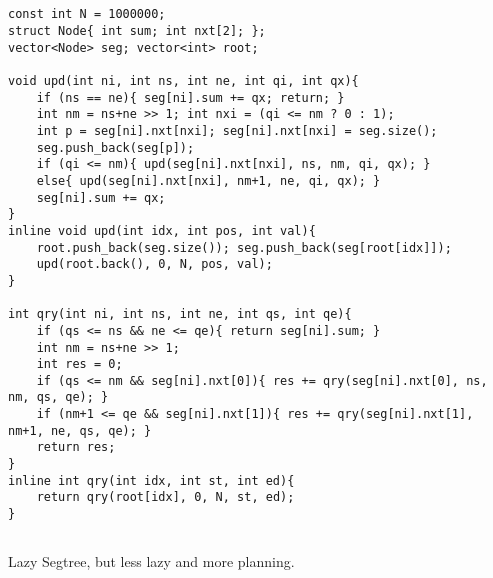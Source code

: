 \documentclass[landscape, 8pt, a4paper, oneside, twocolumn]{extarticle}
\begin{document}
\subsection{}
\begin{verbatim}
const int N = 1000000;
struct Node{ int sum; int nxt[2]; };
vector<Node> seg; vector<int> root;

void upd(int ni, int ns, int ne, int qi, int qx){
    if (ns == ne){ seg[ni].sum += qx; return; }
    int nm = ns+ne >> 1; int nxi = (qi <= nm ? 0 : 1);
    int p = seg[ni].nxt[nxi]; seg[ni].nxt[nxi] = seg.size();
    seg.push_back(seg[p]);
    if (qi <= nm){ upd(seg[ni].nxt[nxi], ns, nm, qi, qx); }
    else{ upd(seg[ni].nxt[nxi], nm+1, ne, qi, qx); }
    seg[ni].sum += qx;
}
inline void upd(int idx, int pos, int val){
    root.push_back(seg.size()); seg.push_back(seg[root[idx]]);
    upd(root.back(), 0, N, pos, val);
}

int qry(int ni, int ns, int ne, int qs, int qe){
    if (qs <= ns && ne <= qe){ return seg[ni].sum; }
    int nm = ns+ne >> 1;
    int res = 0;
    if (qs <= nm && seg[ni].nxt[0]){ res += qry(seg[ni].nxt[0], ns, nm, qs, qe); }
    if (nm+1 <= qe && seg[ni].nxt[1]){ res += qry(seg[ni].nxt[1], nm+1, ne, qs, qe); }
    return res;
}
inline int qry(int idx, int st, int ed){
    return qry(root[idx], 0, N, st, ed);
}
\end{verbatim}
\subsection{}
Lazy Segtree, but less lazy and more planning.
\end{document}

